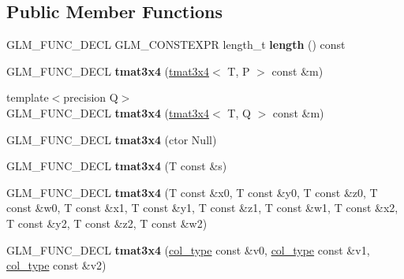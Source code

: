 \subsection*{Public Member Functions}
\begin{DoxyCompactItemize}
\item 
G\+L\+M\+\_\+\+F\+U\+N\+C\+\_\+\+D\+E\+CL G\+L\+M\+\_\+\+C\+O\+N\+S\+T\+E\+X\+PR length\+\_\+t {\bfseries length} () const \hypertarget{structglm_1_1detail_1_1tmat3x4_ad1b616e9c9efe65cb81df719a3962ee1}{}\label{structglm_1_1detail_1_1tmat3x4_ad1b616e9c9efe65cb81df719a3962ee1}

\item 
G\+L\+M\+\_\+\+F\+U\+N\+C\+\_\+\+D\+E\+CL {\bfseries tmat3x4} (\hyperlink{structglm_1_1detail_1_1tmat3x4}{tmat3x4}$<$ T, P $>$ const \&m)\hypertarget{structglm_1_1detail_1_1tmat3x4_ad712792f2a164d4ed2f84ee31226cacd}{}\label{structglm_1_1detail_1_1tmat3x4_ad712792f2a164d4ed2f84ee31226cacd}

\item 
{\footnotesize template$<$precision Q$>$ }\\G\+L\+M\+\_\+\+F\+U\+N\+C\+\_\+\+D\+E\+CL {\bfseries tmat3x4} (\hyperlink{structglm_1_1detail_1_1tmat3x4}{tmat3x4}$<$ T, Q $>$ const \&m)\hypertarget{structglm_1_1detail_1_1tmat3x4_ab8b7d443036f14500e635408e42be95c}{}\label{structglm_1_1detail_1_1tmat3x4_ab8b7d443036f14500e635408e42be95c}

\item 
G\+L\+M\+\_\+\+F\+U\+N\+C\+\_\+\+D\+E\+CL {\bfseries tmat3x4} (ctor Null)\hypertarget{structglm_1_1detail_1_1tmat3x4_a32a8b66fd3ff5ea24c91aa476f2268c7}{}\label{structglm_1_1detail_1_1tmat3x4_a32a8b66fd3ff5ea24c91aa476f2268c7}

\item 
G\+L\+M\+\_\+\+F\+U\+N\+C\+\_\+\+D\+E\+CL {\bfseries tmat3x4} (T const \&s)\hypertarget{structglm_1_1detail_1_1tmat3x4_ad8bf1b12863045314b88499921fe1e61}{}\label{structglm_1_1detail_1_1tmat3x4_ad8bf1b12863045314b88499921fe1e61}

\item 
G\+L\+M\+\_\+\+F\+U\+N\+C\+\_\+\+D\+E\+CL {\bfseries tmat3x4} (T const \&x0, T const \&y0, T const \&z0, T const \&w0, T const \&x1, T const \&y1, T const \&z1, T const \&w1, T const \&x2, T const \&y2, T const \&z2, T const \&w2)\hypertarget{structglm_1_1detail_1_1tmat3x4_a81b6dd1cfa5b7835f6ae42fbd1565c37}{}\label{structglm_1_1detail_1_1tmat3x4_a81b6dd1cfa5b7835f6ae42fbd1565c37}

\item 
G\+L\+M\+\_\+\+F\+U\+N\+C\+\_\+\+D\+E\+CL {\bfseries tmat3x4} (\hyperlink{structglm_1_1detail_1_1tvec4}{col\+\_\+type} const \&v0, \hyperlink{structglm_1_1detail_1_1tvec4}{col\+\_\+type} const \&v1, \hyperlink{structglm_1_1detail_1_1tvec4}{col\+\_\+type} const \&v2)\hypertarget{structglm_1_1detail_1_1tmat3x4_a6cab10dc73539c161f81089f4e49944b}{}\label{structglm_1_1detail_1_1tmat3x4_a6cab10dc73539c161f81089f4e49944b}


\end{DoxyCompactItemize}
